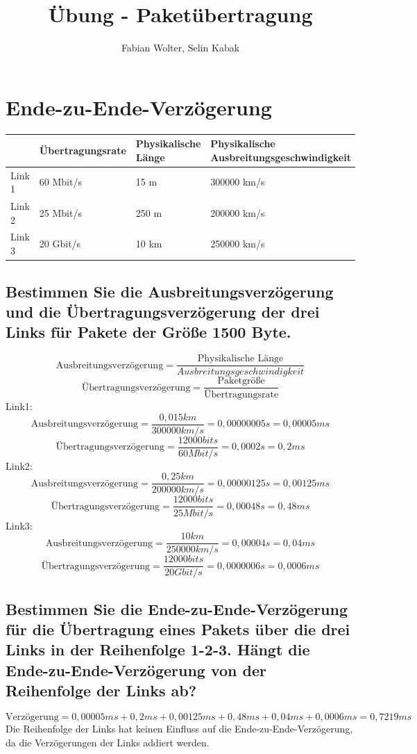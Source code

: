 \documentclass[a4paper, fleqn]{scrartcl}
\title{Übung - Paketübertragung}
\author{Fabian Wolter, Selin Kabak}
\date{}
\begin{document}
\maketitle

\section{Ende-zu-Ende-Verzögerung}
\begin{tabular}{l|l|l|l}
      & Übertragungsrate & Physikalische Länge & Physikalische Ausbreitungsgeschwindigkeit \\
      \hline
      Link 1 & 60 Mbit/s & 15 m & 300000 km/s \\
      Link 2 & 25 Mbit/s & 250 m & 200000 km/s \\
      Link 3 & 20 Gbit/s & 10 km & 250000 km/s
\end{tabular}
\subsection{Bestimmen Sie die Ausbreitungsverzögerung und die Übertragungsverzögerung der drei Links für Pakete der Größe 1500 Byte.}
\[\text{Ausbreitungsverzögerung}=\frac{\text{Physikalische Länge}}{Ausbreitungsgeschwindigkeit}\]
\[\text{Übertragungsverzögerung}=\frac{\text{Paketgröße}}{\text{Übertragungsrate}}\]
Link1:\\
\[\text{Ausbreitungsverzögerung}=\frac{0,015km}{300000km/s}=0,00000005s=0,00005ms\]
\[\text{Übertragungsverzögerung}=\frac{12000bits}{60Mbit/s}=0,0002s=0,2ms\]
Link2:\\
\[\text{Ausbreitungsverzögerung}=\frac{0,25km}{200000km/s}=0,00000125s=0,00125ms\]
\[\text{Übertragungsverzögerung}=\frac{12000bits}{25Mbit/s}=0,00048s=0,48ms\]
Link3:\\
\[\text{Ausbreitungsverzögerung}=\frac{10km}{250000km/s}=0,00004s=0,04ms\]
\[\text{Übertragungsverzögerung}=\frac{12000bits}{20Gbit/s}=0,0000006s=0,0006ms\]
\subsection{Bestimmen Sie die Ende-zu-Ende-Verzögerung für die Übertragung eines Pakets über die drei Links in der Reihenfolge 1-2-3. Hängt die Ende-zu-Ende-Verzögerung von der Reihenfolge der Links ab?}
\[\text{Verzögerung}=0,00005ms+0,2ms+0,00125ms+0,48ms+0,04ms+0,0006ms=0,7219ms\]
Die Reihenfolge der Links hat keinen Einfluss auf die Ende-zu-Ende-Verzögerung, da die Verzögerungen der Links addiert werden.
\end{document}
